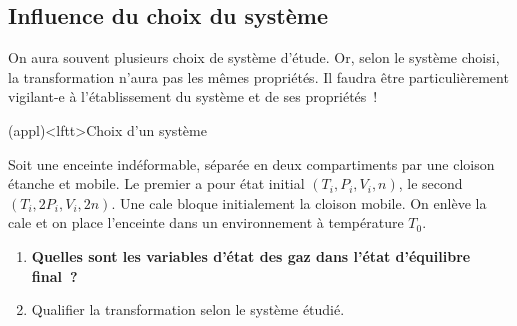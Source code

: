 \documentclass[../../main/main.tex]{subfiles}
\begin{document}
\subsection{Influence du choix du système}
On aura souvent plusieurs choix de système d'étude. Or, selon le système choisi,
la transformation n'aura pas les mêmes propriétés. Il faudra être
particulièrement vigilant-e à l'établissement du système et de ses propriétés~!

\begin{tcb*}[breakable](appl)<lftt>{Choix d'un système}
	\begin{isd}
		Soit une enceinte indéformable, séparée en deux compartiments par une
		cloison étanche et mobile. Le premier a pour état initial $(T_i,P_i,V_i,n)$,
		le second $(T_i,2P_i,V_i,2n)$. Une cale bloque initialement la cloison
		mobile. On enlève la cale et on place l'enceinte dans un environnement à
		température $T_0$.
		\tcblower
		\begin{center}
			\vspace{-15pt}
		\end{center}
	\end{isd}
	\begin{enumerate}
		\item \textbf{Quelles sont les variables d'état des gaz dans l'état
			      d'équilibre final~?}
		\item Qualifier la transformation selon le système étudié.
	\end{enumerate}

\end{tcb*}
\end{document}
